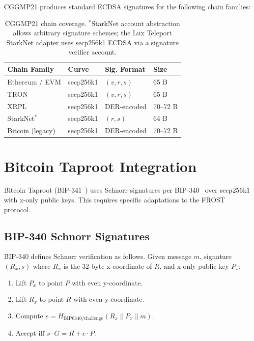 \documentclass[11pt,twocolumn]{article}
\begin{document}
CGGMP21 produces standard ECDSA signatures for the following chain families:

\begin{table}[H]
\centering
\small
\begin{tabular}{@{}llll@{}}
\toprule
\textbf{Chain Family} & \textbf{Curve} & \textbf{Sig. Format} & \textbf{Size} \\
\midrule
Ethereum / EVM & secp256k1 & $(v, r, s)$ & 65 B \\
TRON & secp256k1 & $(v, r, s)$ & 65 B \\
XRPL & secp256k1 & DER-encoded & 70--72 B \\
StarkNet${}^*$ & secp256k1 & $(r, s)$ & 64 B \\
Bitcoin (legacy) & secp256k1 & DER-encoded & 70--72 B \\
\bottomrule
\end{tabular}
\caption{CGGMP21 chain coverage. ${}^*$StarkNet account abstraction allows arbitrary
signature schemes; the Lux Teleport StarkNet adapter uses secp256k1 ECDSA via a
signature verifier account.}
\label{tab:cggmp-chains}
\end{table}

\section{Bitcoin Taproot Integration}
\label{sec:taproot}

Bitcoin Taproot (BIP-341~\cite{bip341}) uses Schnorr signatures per BIP-340~\cite{bip340}
over secp256k1 with x-only public keys. This requires specific adaptations to the
FROST protocol.

\subsection{BIP-340 Schnorr Signatures}

BIP-340 defines Schnorr verification as follows. Given message $m$, signature
$(R_x, s)$ where $R_x$ is the 32-byte x-coordinate of $R$, and x-only public key
$P_x$:

\begin{enumerate}[nosep]
  \item Lift $P_x$ to point $P$ with even y-coordinate.
  \item Lift $R_x$ to point $R$ with even y-coordinate.
  \item Compute $e = H_{\text{BIP0340/challenge}}(R_x \| P_x \| m)$.
  \item Accept iff $s \cdot G = R + e \cdot P$.
\end{enumerate}
\end{document}
